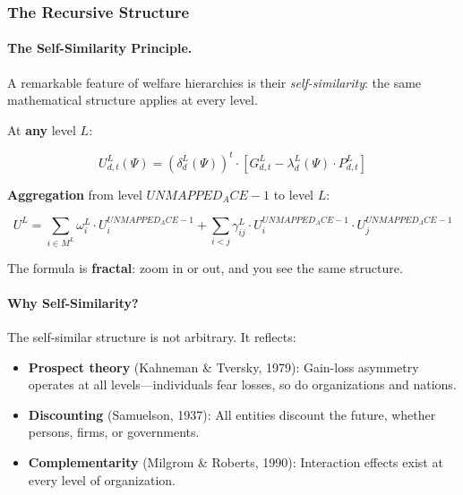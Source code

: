 \subsubsection{The Recursive Structure}

\paragraph{The Self-Similarity Principle.}
A remarkable feature of welfare hierarchies is their \textit{self-similarity}: 
the same mathematical structure applies at every level.

\begin{tcolorbox}[colback=yellow!5!white, colframe=yellow!50!black, title=The Recursive Welfare Formula]
At \textbf{any} level $L$:

\begin{equation}
\boxed{
U^L_{d,t}(\Psi) = \left(\delta^L_d(\Psi)\right)^t \cdot \left[ G^L_{d,t} - \lambda^L_d(\Psi) \cdot P^L_{d,t} \right]
}
\end{equation}

\textbf{Aggregation} from level $UNMAPPED_ACE-1$ to level $L$:

\begin{equation}
\boxed{
U^L = \sum_{i \in M^L} \omega^L_i \cdot U^{UNMAPPED_ACE-1}_i + \sum_{i < j} \gamma^L_{ij} \cdot U^{UNMAPPED_ACE-1}_i \cdot U^{UNMAPPED_ACE-1}_j
}
\end{equation}

The formula is \textbf{fractal}: zoom in or out, and you see the same structure.
\end{tcolorbox}

\paragraph{Why Self-Similarity?}
The self-similar structure is not arbitrary. It reflects:
\begin{itemize}
\item \textbf{Prospect theory} (Kahneman \& Tversky, 1979): Gain-loss asymmetry 
operates at all levels---individuals fear losses, so do organizations and nations.
\item \textbf{Discounting} (Samuelson, 1937): All entities discount the future, 
whether persons, firms, or governments.
\item \textbf{Complementarity} (Milgrom \& Roberts, 1990): Interaction effects 
exist at every level of organization.
\end{itemize}

